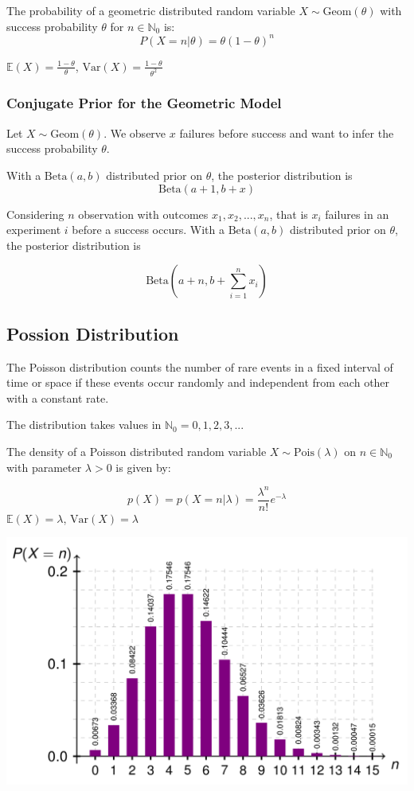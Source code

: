 \documentclass[11pt]{article}
\begin{document}
The probability of a geometric distributed random variable $X \sim \text{Geom}(\theta)$ with success probability $\theta$ for $n \in \mathbb{N}_0$ is:
\begin{equation*}
	P(X=n|\theta) = \theta (1 - \theta)^n
\end{equation*}

\noindent
$\mathbb{E}(X)=\frac{1-\theta}{\theta}$, $\text{Var}(X) = \frac{1-\theta}{\theta^2}$

\subsubsection{Conjugate Prior for the Geometric Model}
Let $X\sim \text{Geom}(\theta)$. We observe $x$ failures before success and want to infer the success probability $\theta$.

With a $\text{Beta}(a,b)$ distributed prior on $\theta$, the posterior distribution is
\begin{equation*}
	\text{Beta}(a+1, b+x)
\end{equation*}

Considering $n$ observation with outcomes $x_1, x_2, ... ,x_n$, that is $x_i$ failures in an experiment $i$ before a success occurs. With a $\text{Beta}(a,b)$ distributed prior on $\theta$, the posterior distribution is

\begin{equation*}
	\text{Beta}(a+n, b+\sum_{i=1}^{n}x_i)
\end{equation*}

\subsection{Possion Distribution}
The Poisson distribution counts the number of rare events in a fixed interval of time or space if these events occur randomly and independent from each other with a constant rate.

The distribution takes values in $\mathbb{N}_0 = 0,1,2,3,...$

The density of a Poisson distributed random variable $X \sim \text{Pois}(\lambda)$ on $n \in \mathbb{N}_0$ with parameter $\lambda > 0$ is given by:

\begin{equation*}
	p(X) = p(X=n|\lambda) = \frac{\lambda^n}{n!}e^{-\lambda}
\end{equation*}
\noindent
$\mathbb{E}(X) = \lambda$, $\text{Var}(X) = \lambda$

\begin{center}
	\includegraphics[width=0.7\linewidth]{img/poisson_distribution_lambda5}
\end{center}
\end{document}
